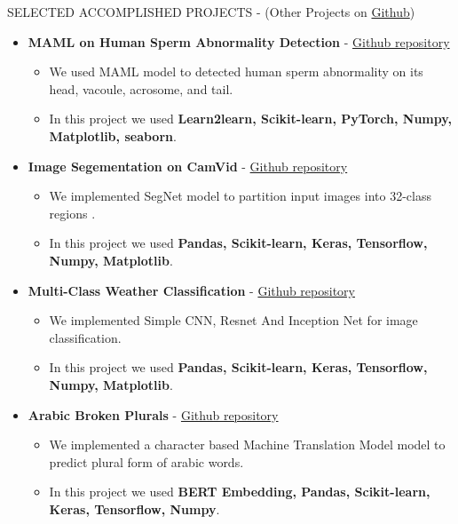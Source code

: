 \documentclass[]{CV}
\begin{document}
\vspace{-4mm}
\begin{section}{SELECTED ACCOMPLISHED PROJECTS { - (Other Projects on \href{https://github.com/amirkasaei}{Github})}}
\begin{itemize}

\item \textbf{MAML on Human Sperm Abnormality Detection} - \href{https://github.com/amirkasaei/Modified-Human-Sperm-Morphology-Analysis}{Github repository}
\begin{itemize}
        \item We used MAML model to detected human sperm abnormality on its head, vacoule, acrosome, and tail. \vspace{-2mm}
        \item In this project we used \textbf{Learn2learn, Scikit-learn, PyTorch, Numpy, Matplotlib, seaborn}.
    \end{itemize}
    
\item \textbf{Image Segementation on CamVid} - \href{https://github.com/amirkasaei/Image-Segementation-CamVid}{Github repository}
   \begin{itemize}
        \item We implemented SegNet model to partition input images into 32-class regions .\vspace{-2mm}
        \item In this project we used \textbf{Pandas, Scikit-learn, Keras, Tensorflow, Numpy, Matplotlib}.
    \end{itemize}
    
     \item \textbf{Multi-Class Weather Classification} - \href{https://github.com/amirkasaei/Multi-Class-Weather-Classification}{Github repository}
   \begin{itemize}
        \item We implemented Simple CNN, Resnet And Inception Net for image classification.\vspace{-2mm}
        \item In this project we used \textbf{Pandas, Scikit-learn, Keras, Tensorflow, Numpy, Matplotlib}.
    \end{itemize}
    
\item \textbf{Arabic Broken Plurals} - \href{https://github.com/amirkasaei/Arabic-Broken-Plurals}{Github repository}
   \begin{itemize}
        \item We implemented a character based Machine Translation Model model to predict plural form of arabic words.\vspace{-2mm}
        \item In this project we used \textbf{BERT Embedding, Pandas, Scikit-learn, Keras, Tensorflow, Numpy}.
    \end{itemize}
\pagebreak  


\end{itemize}
\end{section}
\end{document}
